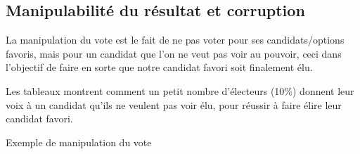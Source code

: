 \documentclass[../report]{subfiles}
\begin{document}

  \subsection{Manipulabilité du résultat et corruption}%
  \label{diff:comp:util:manip}%
  \label{diff:comp:util:corruption}

  La manipulation du vote est le fait de ne pas voter pour ses candidats/options favoris, mais 
  pour un candidat que l'on ne veut pas voir au pouvoir, ceci dans l'objectif de faire en sorte que 
  notre candidat favori soit finalement élu.
  
  Les tableaux  montrent comment un petit nombre d'électeurs 
  (10\%) donnent leur voix à un candidat qu'ils ne veulent pas voir élu, pour réussir à faire 
  élire leur candidat favori.

  \begin{table}[h]
	\begin{center}
		\caption{Exemple de manipulation du vote}%
		\label{fig:critere:manip:example}
		\\[1em]
	\end{center}
  \end{table}
\end{document}
